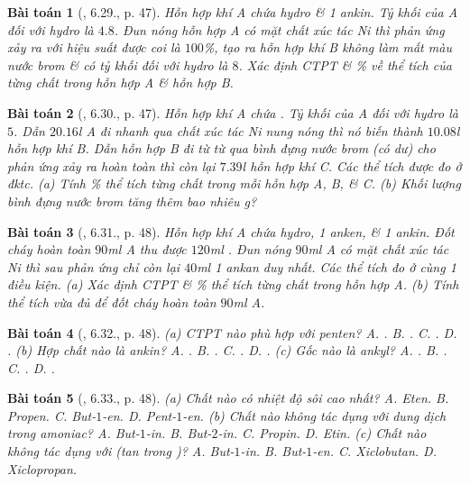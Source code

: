 \documentclass{article}
\newtheorem{baitoan}{Bài toán}
\begin{document}
\begin{baitoan}[\cite{SBT_Hoa_Hoc_11_co_ban}, 6.29., p. 47]
	Hỗn hợp khí A chứa hydro \& 1 ankin. Tỷ khối của A đối với hydro là $4.8$. Đun nóng hỗn hợp A có mặt chất xúc tác \emph{Ni} thì phản ứng xảy ra với hiệu suất được coi là $100$\%, tạo ra hỗn hợp khí B không làm mất màu nước brom \& có tỷ khối đối với hydro là $8$. Xác định CTPT \& \% về thể tích của từng chất trong hỗn hợp A \& hỗn hợp B.
\end{baitoan}

\begin{baitoan}[\cite{SBT_Hoa_Hoc_11_co_ban}, 6.30., p. 47]
	Hỗn hợp khí A chứa \emph{}. Tỷ khối của A đối với hydro là $5$. Dẫn $20.16$\emph{l} A đi nhanh qua chất xúc tác \emph{Ni} nung nóng thì nó biến thành $10.08$\emph{l} hỗn hợp khí B. Dẫn hỗn hợp B đi từ từ qua bình đựng nước brom (có dư) cho phản ứng xảy ra hoàn toàn thì còn lại $7.39$\emph{l} hỗn hợp khí C. Các thể tích được đo ở đktc. (a) Tính \% thể tích từng chất trong mỗi hỗn hợp A, B, \& C. (b) Khối lượng bình đựng nước brom tăng thêm bao nhiêu \emph{g}?
\end{baitoan}

\begin{baitoan}[\cite{SBT_Hoa_Hoc_11_co_ban}, 6.31., p. 48]
	Hỗn hợp khí A chứa hydro, 1 anken, \& 1 ankin. Đốt cháy hoàn toàn $90$\emph{ml} A thu được $120$\emph{ml} \emph{}. Đun nóng $90$\emph{ml} A có mặt chất xúc tác \emph{Ni} thì sau phản ứng chỉ còn lại $40$\emph{ml} 1 ankan duy nhất. Các thể tích đo ở cùng 1 điều kiện. (a) Xác định CTPT \& \% thể tích từng chất trong hỗn hợp A. (b) Tính thể tích \emph{} vừa đủ để đốt cháy hoàn toàn $90$\emph{ml} A.
\end{baitoan}

\begin{baitoan}[\cite{SBT_Hoa_Hoc_11_co_ban}, 6.32., p. 48]
	(a) CTPT nào phù hợp với penten? {\sf A.} \emph{}. {\sf B.} \emph{}. {\sf C.} \emph{}. {\sf D.} \emph{}. (b) Hợp chất nào là ankin? {\sf A.} \emph{}. {\sf B.} \emph{}. {\sf C.} \emph{}. {\sf D.} \emph{}. (c) Gốc nào là ankyl? {\sf A.} \emph{}. {\sf B.} \emph{}. {\sf C.} \emph{}. {\sf D.} \emph{}.
\end{baitoan}

\begin{baitoan}[\cite{SBT_Hoa_Hoc_11_co_ban}, 6.33., p. 48]
	(a) Chất nào có nhiệt độ sôi cao nhất? {\sf A.} Eten. {\sf B.} Propen. {\sf C.} But-$1$-en. {\sf D.} Pent-$1$-en. (b) Chất nào không tác dụng với dung dịch \emph{} trong amoniac? {\sf A.} But-$1$-in. {\sf B.} But-$2$-in. {\sf C.} Propin. {\sf D.} Etin. (c) Chất nào không tác dụng với \emph{} (tan trong \emph{})? {\sf A.} But-$1$-in. {\sf B.} But-$1$-en. {\sf C.} Xiclobutan. {\sf D.} Xiclopropan.
\end{baitoan}
\end{document}
